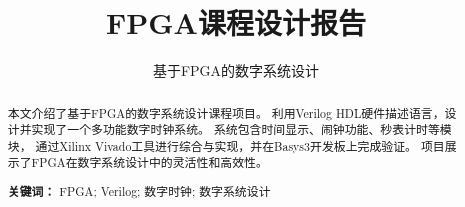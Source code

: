 \documentclass[12pt, a4paper]{ctexart}
\title{FPGA课程设计报告}
\subtitle{基于FPGA的数字系统设计}
\begin{document}
\makecover


\newpage
\begin{abstract}
本文介绍了基于FPGA的数字系统设计课程项目。
利用Verilog HDL硬件描述语言，设计并实现了一个多功能数字时钟系统。
系统包含时间显示、闹钟功能、秒表计时等模块，
通过Xilinx Vivado工具进行综合与实现，并在Basys3开发板上完成验证。
项目展示了FPGA在数字系统设计中的灵活性和高效性。
\par
\textbf{关键词：} FPGA; Verilog; 数字时钟; 数字系统设计
\end{abstract}

\tableofcontents
\clearpage

\setcounter{page}{1} %












\end{document}
